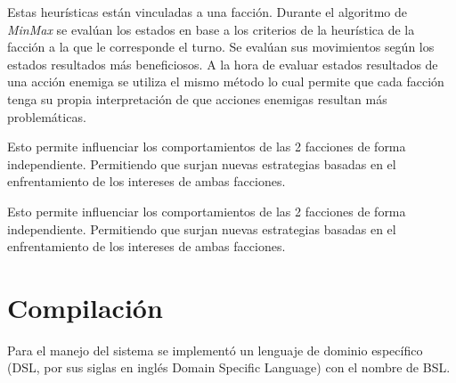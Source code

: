 \documentclass[twoside]{article}
\begin{document}
Estas heur\'isticas est\'an vinculadas a una facci\'on. Durante el algoritmo de \emph{MinMax} se eval\'uan los estados en base a los criterios de la heur\'istica de la facci\'on a la que le corresponde el turno. Se eval\'uan sus movimientos seg\'un los estados resultados m\'as beneficiosos. A la hora de evaluar estados resultados de una acci\'on enemiga se utiliza el mismo m\'etodo lo cual permite que cada facci\'on tenga su propia interpretaci\'on de que acciones enemigas resultan m\'as problemáticas.

Esto permite influenciar los comportamientos de las 2 facciones de forma independiente. Permitiendo que surjan nuevas estrategias basadas en el enfrentamiento de los intereses de ambas facciones.
		
		Esto permite influenciar los comportamientos de las 2 facciones de forma independiente. Permitiendo que surjan nuevas estrategias basadas en el enfrentamiento de los intereses de ambas facciones.
		
		\section{Compilaci\'on}
		Para el manejo del sistema se implement\'o un lenguaje de dominio espec\'ifico (DSL, por sus siglas en ingl\'es Domain Specific Language) con el nombre de BSL. 
		
\end{document}
